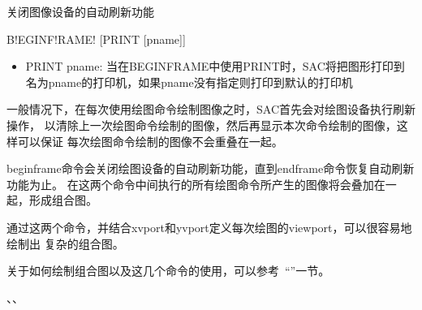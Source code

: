 \label{cmd:beginframe}

关闭图像设备的自动刷新功能

\begin{SACSTX}
B!EGINF!RAME! [PRINT [pname]]
\end{SACSTX}

\begin{itemize}
\item PRINT pname: 当在BEGINFRAME中使用PRINT时，SAC将把图形打印到名为pname的打印机，如果pname没有指定则打印到默认的打印机
\end{itemize}

一般情况下，在每次使用绘图命令绘制图像之时，SAC首先会对绘图设备执行刷新操作，
以清除上一次绘图命令绘制的图像，然后再显示本次命令绘制的图像，这样可以保证
每次绘图命令绘制的图像不会重叠在一起。

beginframe命令会关闭绘图设备的自动刷新功能，直到endframe命令恢复自动刷新功能为止。
在这两个命令中间执行的所有绘图命令所产生的图像将会叠加在一起，形成组合图。

通过这两个命令，并结合xvport和yvport定义每次绘图的viewport，可以很容易地绘制出
复杂的组合图。

关于如何绘制组合图以及这几个命令的使用，可以参考~``''一节。

、、

